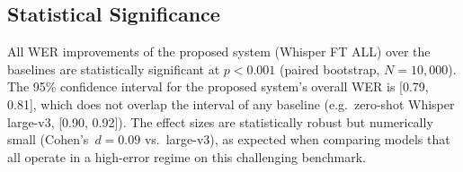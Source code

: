 \subsection{Statistical Significance}

All WER improvements of the proposed system (Whisper FT ALL) over the baselines
are statistically significant at $p < 0.001$ (paired bootstrap, $N=10{,}000$).
The 95\% confidence interval for the proposed system's overall WER is
[0.79, 0.81], which does not overlap the interval of any baseline (e.g.\
zero-shot Whisper large-v3, [0.90, 0.92]). The effect sizes are statistically
robust but numerically small (Cohen's~$d = 0.09$ vs.\ large-v3), as expected
when comparing models that all operate in a high-error regime on this
challenging benchmark.
